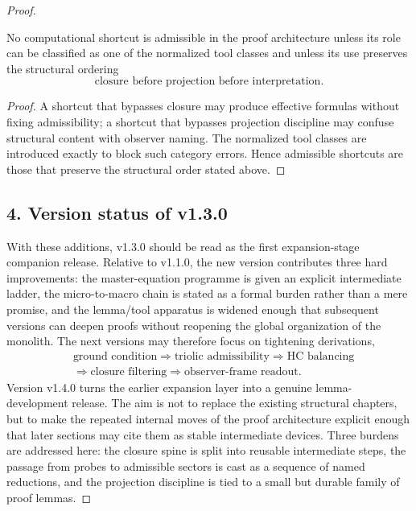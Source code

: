 \begin{proof}
\begin{corollary}
\label{cor:tool-usage-discipline}
No computational shortcut is admissible in the proof architecture unless its
role can be classified as one of the normalized tool classes and unless its use
preserves the structural ordering
\[
\text{closure before projection before interpretation}.
\]
\end{corollary}

\begin{proof}
A shortcut that bypasses closure may produce effective formulas without fixing
admissibility; a shortcut that bypasses projection discipline may confuse
structural content with observer naming. The normalized tool classes are
introduced exactly to block such category errors. Hence admissible shortcuts are
those that preserve the structural order stated above.
\end{proof}

\subsection*{4. Version status of v1.3.0}
With these additions, v1.3.0 should be read as the first expansion-stage
companion release. Relative to v1.1.0, the new version contributes three hard
improvements: the master-equation programme is given an explicit intermediate
ladder, the micro-to-macro chain is stated as a formal burden rather than a
mere promise, and the lemma/tool apparatus is widened enough that subsequent
versions can deepen proofs without reopening the global organization of the
monolith. The next versions may therefore focus on tightening derivations,
\[
\begin{aligned}
&\text{ground condition}
\Longrightarrow
\text{triolic admissibility}
\Longrightarrow
\text{HC balancing}
\\[0.2em]
&\Longrightarrow
\text{closure filtering}
\Longrightarrow
\text{observer-frame readout}.
\end{aligned}
\]
Version v1.4.0 turns the earlier expansion layer into a genuine
lemma-development release. The aim is not to replace the existing structural
chapters, but to make the repeated internal moves of the proof architecture
explicit enough that later sections may cite them as stable intermediate
devices. Three burdens are addressed here: the closure spine is split into
reusable intermediate steps, the passage from probes to admissible sectors is
cast as a sequence of named reductions, and the projection discipline is tied
to a small but durable family of proof lemmas.



\end{proof}
